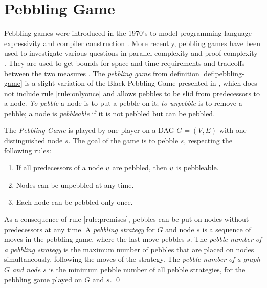 \documentclass{llncs}
\begin{document}
\section{Pebbling Game}
\label{sec:pebbling-game}

Pebbling games were introduced in the 1970's to model programming language expressivity \cite{paterson1970comparative,Walker1973404} and compiler construction \cite{sethi1975complete}. More recently, pebbling games have been used to investigate various questions in parallel complexity \cite{chan2013pebble} and proof complexity \cite{ben2008short,Esteban200184,nordstrom2009narrow}. They are used to get bounds for space and time requirements and tradeoffs between the two measures \cite{van1979move}. The \emph{pebbling game} from definition \ref{def:pebbling-game} is a slight variation of the Black Pebbling Game presented in \cite{hertel2007black}, which does not include rule \ref{rule:onlyonce} and allows pebbles to be slid from predecessors to a node. \textit{To pebble} a node is to put a pebble on it; \textit{to unpebble} is to remove a pebble; a node is \textit{pebbleable} if it is not pebbled but can be pebbled.

\begin{definition}
\label{def:pebbling-game}
The \emph{Pebbling Game} is played by one player on a DAG $G = (V,E)$ with one distinguished node $s$.
The goal of the game is to pebble $s$, respecting the following rules:
\begin{enumerate}
	\item \label{rule:premises} If all predecessors of a node $v$ are pebbled, then $v$ is pebbleable.
	\item \label{rule:unpebbling} Nodes can be unpebbled at any time.
	\item \label{rule:onlyonce} Each node can be pebbled only once.
\end{enumerate}
As a consequence of rule \ref{rule:premises}, pebbles can be put on nodes without predecessors at any time.
A \emph{pebbling strategy} for $G$ and node $s$ is a sequence of moves in the pebbling game, where the last move pebbles $s$.
The \emph{pebble number of a pebbling strategy} is the maximum number of pebbles that are placed on nodes simultaneously, following the moves of the strategy.
The \emph{pebble number of a graph $G$ and node $s$} is the minimum pebble number of all pebble strategies, for the pebbling game played on $G$ and $s$.
\qed
\end{definition}
\end{document}
